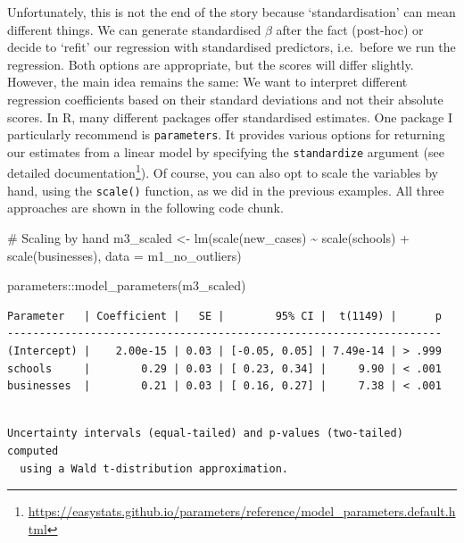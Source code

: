 \documentclass[
  letterpaper,
]{krantz}
\makeatletter
\newenvironment{Shaded}{\begin{snugshade}}{\end{snugshade}}
\newcommand{\AttributeTok}[1]{\textcolor[rgb]{0.40,0.45,0.13}{#1}}
\newcommand{\CommentTok}[1]{\textcolor[rgb]{0.37,0.37,0.37}{#1}}
\newcommand{\FunctionTok}[1]{\textcolor[rgb]{0.28,0.35,0.67}{#1}}
\newcommand{\NormalTok}[1]{\textcolor[rgb]{0.00,0.23,0.31}{#1}}
\newcommand{\OtherTok}[1]{\textcolor[rgb]{0.00,0.23,0.31}{#1}}
\newcommand{\SpecialCharTok}[1]{\textcolor[rgb]{0.37,0.37,0.37}{#1}}
\renewcommand{\href}[2]{#2\footnote{\url{#1}}}
\newenvironment{kframe}{%
\medskip{}
\setlength{\fboxsep}{.8em}
 \def\at@end@of@kframe{}%
 \ifinner\ifhmode%
  \def\at@end@of@kframe{\end{minipage}}%
  \begin{minipage}{\columnwidth}%
 \fi\fi%
 \def\FrameCommand##1{\hskip\@totalleftmargin \hskip-\fboxsep
 \colorbox{shadecolor}{##1}\hskip-\fboxsep
     \hskip-\linewidth \hskip-\@totalleftmargin \hskip\columnwidth}%
 \MakeFramed {\advance\hsize-\width
   \@totalleftmargin\z@ \linewidth\hsize
   \@setminipage}}%
 {\par\unskip\endMakeFramed%
 \at@end@of@kframe}
\renewenvironment{Shaded}{\begin{kframe}}{\end{kframe}}
\makeatother
\begin{document}
Unfortunately, this is not the end of the story because
`standardisation' can mean different things. We can generate
standardised \(\beta\) after the fact (post-hoc) or decide to `refit'
our regression with standardised predictors, i.e.~before we run the
regression. Both options are appropriate, but the scores will differ
slightly. However, the main idea remains the same: We want to interpret
different regression coefficients based on their standard deviations and
not their absolute scores. In R, many different packages offer
standardised estimates. One package I particularly recommend is
\texttt{parameters}. It provides various options for returning our
estimates from a linear model by specifying the \texttt{standardize}
argument (see
\href{https://easystats.github.io/parameters/reference/model_parameters.default.html}{detailed
documentation}). Of course, you can also opt to scale the variables by
hand, using the \texttt{scale()} function, as we did in the previous
examples. All three approaches are shown in the following code chunk.

\begin{Shaded}
\begin{Highlighting}[]
\CommentTok{\# Scaling \textquotesingle{}by hand\textquotesingle{}}
\NormalTok{m3\_scaled }\OtherTok{\textless{}{-}} \FunctionTok{lm}\NormalTok{(}\FunctionTok{scale}\NormalTok{(new\_cases) }\SpecialCharTok{\textasciitilde{}}
                  \FunctionTok{scale}\NormalTok{(schools) }\SpecialCharTok{+}
                  \FunctionTok{scale}\NormalTok{(businesses),}
                \AttributeTok{data =}\NormalTok{ m1\_no\_outliers)}

\NormalTok{parameters}\SpecialCharTok{::}\FunctionTok{model\_parameters}\NormalTok{(m3\_scaled)}
\end{Highlighting}
\end{Shaded}

\begin{verbatim}
Parameter   | Coefficient |   SE |        95% CI |  t(1149) |      p
--------------------------------------------------------------------
(Intercept) |    2.00e-15 | 0.03 | [-0.05, 0.05] | 7.49e-14 | > .999
schools     |        0.29 | 0.03 | [ 0.23, 0.34] |     9.90 | < .001
businesses  |        0.21 | 0.03 | [ 0.16, 0.27] |     7.38 | < .001
\end{verbatim}

\begin{verbatim}

Uncertainty intervals (equal-tailed) and p-values (two-tailed) computed
  using a Wald t-distribution approximation.
\end{verbatim}
\end{document}
